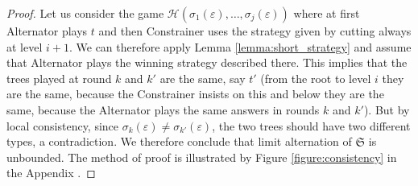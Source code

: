\begin{proof}

Let us consider the game $\mathcal{H}( \sigma_1(\varepsilon), \dots, \sigma_j(\varepsilon))$ where at first Alternator plays $t$ and then Constrainer uses the strategy given by cutting always at level $i+1$. We can therefore apply Lemma \ref{lemma:short_strategy} and assume that Alternator plays the winning strategy described there. This implies that the trees played at round $k$ and $k'$ are the same, say $t'$ (from the root to level $i$ they are the same, because the Constrainer insists on this and below they are the same, because the Alternator plays the same answers in rounds $k$ and $k'$). But by local consistency, since $\sigma_k(\varepsilon)\neq \sigma_{k'}(\varepsilon)$, the two trees should have two different types, a contradiction. We therefore conclude that limit alternation of $\mathfrak{S}$ is unbounded. The method of proof is illustrated by Figure \ref{figure:consistency} in the Appendix .
\end{proof}
